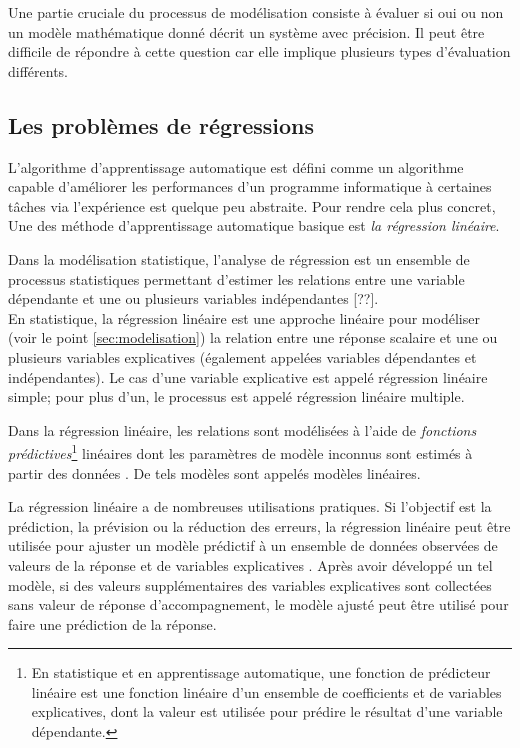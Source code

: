	
	Une partie cruciale du processus de modélisation consiste à évaluer si oui ou non un modèle mathématique donné décrit un système avec précision. Il peut être difficile de répondre à cette question car elle implique plusieurs types d'évaluation différents.
	
	

	\subsection{Les problèmes de régressions}
	
	L'algorithme d'apprentissage automatique est défini comme un algorithme capable d'améliorer les performances d'un programme informatique à certaines tâches via l'expérience est quelque peu abstraite. Pour rendre cela plus concret, Une des méthode d'apprentissage automatique basique est \emph{la régression linéaire}\cite{goodfellow2016deep}.
	
	Dans la modélisation statistique, l'analyse de régression est un ensemble de processus statistiques permettant d'estimer les relations entre une variable dépendante et une ou plusieurs variables indépendantes [??].\\
	En statistique, la régression linéaire est une approche linéaire pour modéliser (voir le point \ref{sec:modelisation}) la relation entre une réponse scalaire et une ou plusieurs variables explicatives (également appelées variables dépendantes et indépendantes). Le cas d'une variable explicative est appelé régression linéaire simple; pour plus d'un, le processus est appelé régression linéaire multiple.
	
	Dans la régression linéaire, les relations sont modélisées à l'aide de \textit{fonctions prédictives}\footnote{En statistique et en apprentissage automatique, une fonction de prédicteur linéaire est une fonction linéaire d'un ensemble de coefficients et de variables explicatives, dont la valeur est utilisée pour prédire le résultat d'une variable dépendante.} linéaires dont les paramètres de modèle inconnus sont estimés à partir des données \cite{matloff2017statistical}. De tels modèles sont appelés modèles linéaires.
	
	La régression linéaire a de nombreuses utilisations pratiques. Si l'objectif est la prédiction, la prévision ou la réduction des erreurs, la régression linéaire peut être utilisée pour ajuster un modèle prédictif à un ensemble de données observées de valeurs de la réponse et de variables explicatives \cite{darlington2016regression}. Après avoir développé un tel modèle, si des valeurs supplémentaires des variables explicatives sont collectées sans valeur de réponse d'accompagnement, le modèle ajusté peut être utilisé pour faire une prédiction de la réponse.
	
